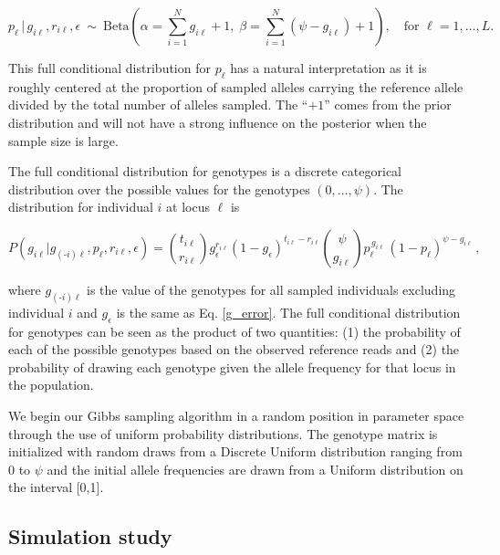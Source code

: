 \documentclass[11pt,english,letterpaper,oneside]{article}
\begin{document}
\begin{equation}\label{p-full}
p_{\ell}\,|\,g_{i \ell},r_{i \ell},\epsilon \: \sim \: \text{Beta}\left(\alpha= \sum_{i=1}^N g_{i \ell} +1,\; \beta = \sum_{i=1}^N (\psi-g_{i \ell})+1\right),\quad \text{for } \ell = 1,\ldots,L.
\end{equation}

\noindent This full conditional distribution for $p_{\ell}$ has a natural interpretation as it is roughly centered at the proportion of sampled alleles carrying the reference allele divided by the total number of alleles sampled. The ``$+1$'' comes from the prior distribution and will not have a strong influence on the posterior when the sample size is large.
\medskip

The full conditional distribution for genotypes is a discrete categorical distribution over the possible values for the genotypes $(0,\ldots,\psi)$. The distribution for individual $i$ at locus $\ell$ is

\begin{equation}\label{G-full}
P(g_{i \ell}|g_{(\text{-}i) \ell},p_{\ell},r_{i \ell},\epsilon) = \binom{t_{i\ell}}{r_{i\ell}} g_\epsilon^{r_{i \ell}}(1-g_\epsilon)^{t_{i \ell}-r_{i \ell}}\displaystyle\binom{\psi}{g_{i \ell}}p_{\ell}^{\,g_{i \ell}}\,(1-p_{\ell})^{\psi-g_{i \ell}}\,,
\end{equation}

\noindent where $g_{(\text{-}i) \ell}$ is the value of the genotypes for all sampled individuals excluding individual $i$ and $g_\epsilon$ is the same as Eq. \ref{g_error}. The full conditional distribution for genotypes can be seen as the product of two quantities: (1) the probability of each of the possible genotypes based on the observed  reference reads and (2) the probability of drawing each genotype given the allele frequency for that locus in the population.
\medskip  

We begin our Gibbs sampling algorithm in a random position in parameter space through the use of uniform probability distributions. The genotype matrix is initialized with random draws from a Discrete Uniform distribution ranging from $0$ to $\psi$ and the initial allele frequencies are drawn from a Uniform distribution on the interval [0,1].

\medskip
\subsection{Simulation study} %
\medskip
\end{document}
